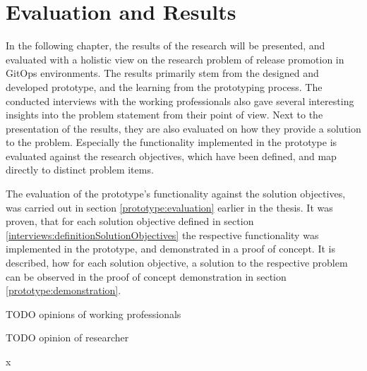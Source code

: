 
\chapter{Evaluation and Results}
\label{evaluation-and-results}

In the following chapter,
the results of the research will be presented,
and evaluated with a holistic view on the research problem of release promotion in GitOps environments.
The results primarily stem from the designed and developed prototype,
and the learning from the prototyping process.
The conducted interviews with the working professionals also gave several interesting insights into
the problem statement from their point of view.
Next to the presentation of the results, they are also evaluated on how they provide a solution
to the problem.
Especially the functionality implemented in the prototype is evaluated against the research objectives,
which have been defined, and map directly to distinct problem items.

The evaluation of the prototype's functionality against the solution objectives,
was carried out in section \ref{prototype:evaluation} earlier in the thesis.
It was proven, that for each solution objective defined in section \ref{interviews:definitionSolutionObjectives}
the respective functionality was implemented in the prototype,
and demonstrated in a proof of concept.
It is described, how for each solution objective,
a solution to the respective problem can be observed in the
proof of concept demonstration in section \ref{prototype:demonstration}.

{\color{red}TODO opinions of working professionals}

{\color{red}TODO opinion of researcher}


x























